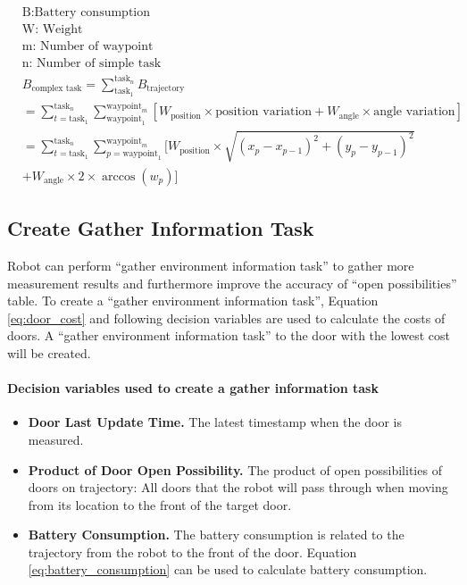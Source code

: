 \begin{equation}
\begin{aligned}
\label{eq:battery_consumption}
& \mbox{B:Battery consumption } \\
& \mbox{W: Weight } \\
& \mbox{m: Number of waypoint } \\
& \mbox{n: Number of simple task} \\
& B_{\mbox{complex task}} = \sum_{\mbox{task}_1}^{\mbox{task}_n} B_{\mbox{trajectory}} \\
& = \sum_{t = \mbox{task}_1}^{\mbox{task}_n} \sum_{\mbox{waypoint}_1}^{\mbox{waypoint}_m} [W_{\mbox{position}} \times \mbox{position variation}+W_{\mbox{angle}} \times \mbox{angle variation}]\\
& = \sum_{t = \mbox{task}_1}^{\mbox{task}_n} \sum_{p = \mbox{waypoint}_1}^{\mbox{waypoint}_m} [ W_{\mbox{position}} \times \sqrt{(x_p-x_{p-1} )^2+(y_p-y_{p-1} )^2} \\
& + W_{\mbox{angle}} \times 2 \times \arccos(w_p)] 
\end{aligned}
\end{equation}


\subsection{Create Gather Information Task}
\label{sec:create_gather_information_task}
Robot can perform ``gather environment information task'' to gather more measurement results and furthermore improve the accuracy of ``open possibilities'' table.
To create a ``gather environment information task'', Equation \ref{eq:door_cost} and following decision variables are used to calculate the costs of doors. A ``gather environment information task'' to the door with the lowest cost will be created.
\paragraph{Decision variables used to create a gather information task}
\begin{itemize}
 \item \textbf{Door Last Update Time.} The latest timestamp when the door is measured.
 \item \textbf{Product of Door Open Possibility.} The product of open possibilities of doors on trajectory: All doors that the robot will pass through when moving from its location to the front of the target door.
 \item \textbf{Battery Consumption.} The battery consumption is related to the trajectory from the robot to the front of the door. Equation \ref{eq:battery_consumption} can be used to calculate battery consumption.
\end{itemize}

